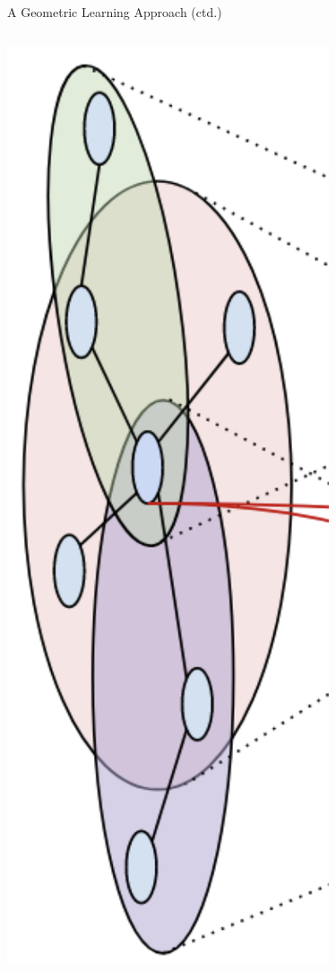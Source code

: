 \begin{frame}{A Geometric Learning Approach (ctd.)}
\begin{columns}
\begin{column}{0.17\linewidth}
        \includegraphics[scale=0.21]{figures/gnn_cluster.png}
        \caption{}
    \end{column}
\end{columns}
\end{frame}


